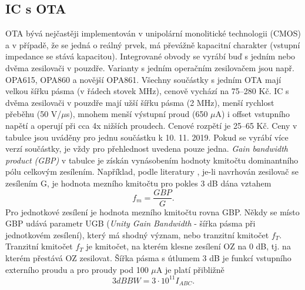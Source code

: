 \subsection{IC s OTA}
OTA bývá nejčastěji implementován v unipolární monolitické technologii (CMOS) a v případě, že se jedná o reálný prvek, má převážně kapacitní charakter (vstupní impedance se stává kapacitou). Integrované obvody se vyrábí buď s jedním nebo dvěma zesilovači v pouzdře. Varianty s jedním operačním zesilovačem jsou např. OPA615, OPA860 a novější OPA861. Všechny součástky s jedním OTA mají velkou šířku pásma (v řádech stovek MHz), cenově vychází na 75--280 Kč. IC s dvěma zesilovači v pouzdře mají užší šířku pásma (2 MHz), menší rychlost přeběhu (50 V/$\mu$s), mnohem menší výstupní proud (650 $\mu$A) i offset vstupního napětí a operují při cca 4x nižších proudech. Cenové rozpětí je 25--65 Kč. Ceny v tabulce jsou uváděny pro jednu součástku k 10. 11. 2019. Pokud se vyrábí více verzí součástky, je vždy pro přehlednost uvedena pouze jedna. \textit{Gain bandwidth product (GBP)} v tabulce je získán vynásobením hodnoty kmitočtu dominantního pólu celkovým zesílením. Například, podle literatury \cite{11}, je-li navrhován zesilovač se zesílením G, je hodnota mezního kmitočtu pro pokles 3 dB dána vztahem
\begin{equation}
f_m = \frac{GBP}{G}.
\end{equation}
\noindent Pro jednotkové zesílení je hodnota mezního kmitočtu rovna GBP. Někdy se místo GBP udává parametr UGB (\textit{Unity Gain Bandwidth} - šířka pásma při jednotkovém zesílení), který má shodný význam, nebo tranzitní kmitočet $f_T$. Tranzitní kmitočet $f_T$ je kmitočet, na kterém klesne zesílení OZ na 0 dB, tj. na kterém přestává OZ zesilovat. Šířka pásma s útlumem 3 dB je funkcí vstupního externího proudu a pro proudy pod 100 $\mu$A je platí přibližně
\begin{equation}
3dB BW = 3 \cdot 10^{11} I_{ABC}.
\end{equation}
\renewcommand{\arraystretch}{1.5}
